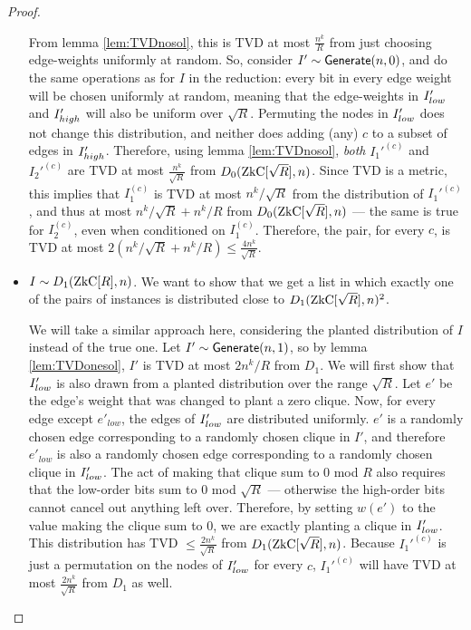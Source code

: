 \begin{proof}
\begin{itemize}
		From lemma \ref{lem:TVDnosol}, this is TVD at most $\frac {n^k}{R}$ from just choosing edge-weights uniformly at random. So, consider $I' \sim \mathsf{Generate}(n,0)$, and do the same operations as for $I$ in the reduction: every bit in every edge weight will be chosen uniformly at random, meaning that the edge-weights in $I_{low}'$ and $I_{high}'$ will also be uniform over $\sqrt R$. Permuting the nodes in $I_{low}'$ does not change this distribution, and neither does adding (any) $c$ to a subset of edges in $I_{high}'$. Therefore, using lemma \ref{lem:TVDnosol}, \emph{both} $I_1'^{(c)}$ and $I_2'^{(c)}$ are TVD at most $\frac{n^k}{\sqrt R}$ from $D_0(\ZkC[\sqrt R], n)$. Since TVD is a metric, this implies that $I_1^{(c)}$ is TVD at most $n^k / \sqrt R$ from the distribution of $I_1'^{(c)}$, and thus at most $n^k / \sqrt R + n^k/ R$ from $D_0(\ZkC[\sqrt R], n)$ --- the same is true for $I_2^{(c)}$, even when conditioned on $I_1^{(c)}$. Therefore, the pair, for every $c$, is TVD at most $2(n^k / \sqrt R + n^k/ R) \le \frac{4 n^k}{\sqrt R}$.
		
		
		\item $I \sim D_1(\ZkC[R], n)$. We want to show that we get a list in which exactly one of the pairs of instances is distributed close to $D_1(\ZkC[\sqrt R], n)^2$.
		
		We will take a similar approach here, considering the planted distribution of $I$ instead of the true one. Let $I' \sim \mathsf{Generate}(n,1)$, so by lemma \ref{lem:TVDonesol}, $I'$ is TVD at most $2n^k/R$ from $D_1$. We will first show that $I_{low}'$ is also drawn from a planted distribution over the range $\sqrt R$.
		Let $e'$ be the edge's weight that was changed to plant a zero clique. Now, for every edge except $e'_{low}$, the edges of $I_{low}'$ are distributed uniformly. $e'$ is a randomly chosen edge corresponding to a randomly chosen clique in $I'$, and therefore $e'_{low}$ is also a randomly chosen edge corresponding to a randomly chosen clique in $I_{low}'$. The act of making that clique sum to 0 mod $R$ also requires that the low-order bits sum to $0$ mod $\sqrt R$ --- otherwise the high-order bits cannot cancel out anything left over. Therefore, by setting $w(e')$ to the value making the clique sum to 0, we are exactly planting a clique in $I_{low}'$. This distribution has TVD $\le \frac{2n^k}{\sqrt R}$ from $D_1(\ZkC[\sqrt R], n)$. Because $I_1'^{(c)}$ is just a permutation on the nodes of $I_{low}'$ for every $c$, $I_1'^{(c)}$ will have TVD at most $\frac{2n^k}{\sqrt R}$ from $D_1$ as well.
		

\end{itemize}
\end{proof}
